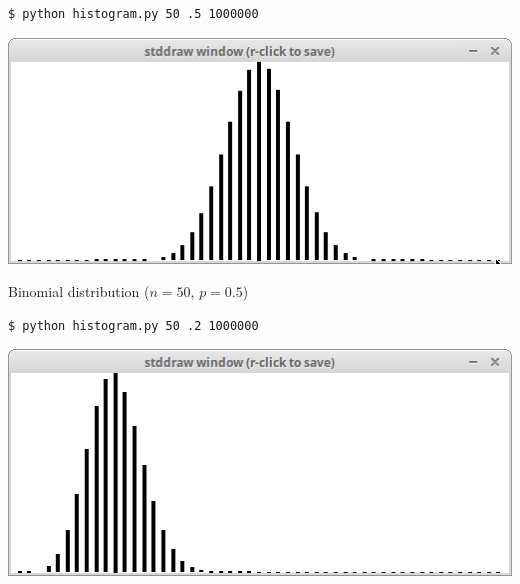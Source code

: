 \documentclass[8pt,a4paper,compress,handout]{beamer}
\begin{document}
\begin{frame}[fragile]
\begin{minipage}{200pt}
\begin{lstlisting}[language={}]
$ python histogram.py 50 .5 1000000
\end{lstlisting}
\end{minipage}%
\hfill
\begin{minipage}{100pt}
\begin{center}
\includegraphics[scale=0.2]{figures/histogram1.png}

\smallskip

\tiny Binomial distribution ($n=50$, $p=0.5$)
\end{center}
\end{minipage}%

\bigskip

\begin{minipage}{200pt}
\begin{lstlisting}[language={}]
$ python histogram.py 50 .2 1000000
\end{lstlisting}
\end{minipage}%
\hfill
\begin{minipage}{100pt}
\begin{center}
\includegraphics[scale=0.2]{figures/histogram2.png}

\smallskip


\end{center}
\end{minipage}
\end{frame}
\end{document}
